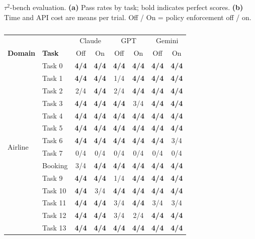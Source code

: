 \begin{table}[t]
\caption{$\tau^2$-bench evaluation. \textbf{(a)} Pass rates by task; bold indicates perfect scores. \textbf{(b)} Time and API cost are means per trial. Off / On = policy enforcement off / on.}
\label{tab:tau2}
\small
\centering
\begin{subtable}[t]{0.6\textwidth}
\centering
\caption{}
\setlength{\tabcolsep}{4pt}
\begin{tabular}{@{}llcccccc@{}}
\toprule
 & & \multicolumn{2}{c}{Claude} & \multicolumn{2}{c}{GPT} & \multicolumn{2}{c}{Gemini} \\
\cmidrule(lr){3-4} \cmidrule(lr){5-6} \cmidrule(lr){7-8}
\textbf{Domain} & \textbf{Task} & Off & On & Off & On & Off & On \\
\midrule
\multirow{51}{*}{Airline} & Task 0 & \textbf{4/4} & \textbf{4/4} & \textbf{4/4} & \textbf{4/4} & \textbf{4/4} & \textbf{4/4} \\
 & Task 1 & \textbf{4/4} & \textbf{4/4} & 1/4 & \textbf{4/4} & \textbf{4/4} & \textbf{4/4} \\
 & Task 2 & 2/4 & \textbf{4/4} & 2/4 & \textbf{4/4} & \textbf{4/4} & \textbf{4/4} \\
 & Task 3 & \textbf{4/4} & \textbf{4/4} & \textbf{4/4} & 3/4 & \textbf{4/4} & \textbf{4/4} \\
 & Task 4 & \textbf{4/4} & \textbf{4/4} & \textbf{4/4} & \textbf{4/4} & \textbf{4/4} & \textbf{4/4} \\
 & Task 5 & \textbf{4/4} & \textbf{4/4} & \textbf{4/4} & \textbf{4/4} & \textbf{4/4} & \textbf{4/4} \\
 & Task 6 & \textbf{4/4} & \textbf{4/4} & \textbf{4/4} & \textbf{4/4} & \textbf{4/4} & 3/4 \\
 & Task 7 & 0/4 & 0/4 & 0/4 & 0/4 & 0/4 & 0/4 \\
 & Booking & 3/4 & \textbf{4/4} & \textbf{4/4} & \textbf{4/4} & \textbf{4/4} & \textbf{4/4} \\
 & Task 9 & \textbf{4/4} & \textbf{4/4} & 1/4 & \textbf{4/4} & \textbf{4/4} & \textbf{4/4} \\
 & Task 10 & \textbf{4/4} & 3/4 & \textbf{4/4} & \textbf{4/4} & \textbf{4/4} & \textbf{4/4} \\
 & Task 11 & \textbf{4/4} & \textbf{4/4} & 3/4 & \textbf{4/4} & 3/4 & 3/4 \\
 & Task 12 & \textbf{4/4} & \textbf{4/4} & 3/4 & 2/4 & \textbf{4/4} & \textbf{4/4} \\
 & Task 13 & \textbf{4/4} & \textbf{4/4} & \textbf{4/4} & \textbf{4/4} & \textbf{4/4} & \textbf{4/4} \\

\end{tabular}
\end{subtable}
\end{table}
